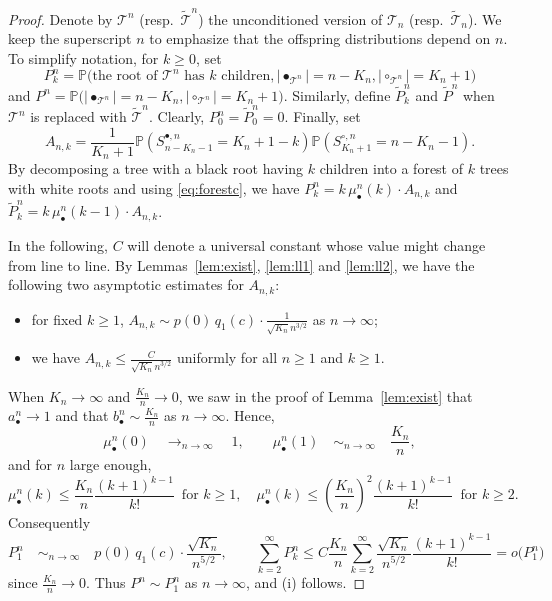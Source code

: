 \documentclass[10pt]{amsart}
\theoremstyle{definition}\newtheorem{defi}[theo]{Definition}\newtheorem{rema}[theo]{Remark}\newtheorem{exam}[theo]{Example}\newtheorem{exem}[theo]{Example}\newtheorem{nota}[theo]{Notation}
\providecommand{\abs}[1]{\lvert#1\rvert}
\def\abn{a_{\bullet}^{n}}
\def\bbn{b_{\bullet}^{n}}
\def\mubn{\mu_{\bullet}^{n}}
\def\Sbn{S^{\bullet,n}}
\def\Scn{S^{\circ,n}}
\def\tTs{\tilde{\Ts}}
\def\Ts{\mathscr{T}}
\renewcommand\Pr[1]{\mathbb{P}\left(#1\right)}
\newcommand\Prb[1]{\mathbb{P}\big(#1\big)}
\begin{document}
\begin{proof}
Denote by $\Ts^{n}$ (resp.~$\tTs^{n}$) the unconditioned version of $\Ts_{n}$ (resp.~$\tTs_{n}$). We keep the superscript $n$ to emphasize that the offspring distributions depend on $n$. To simplify notation, for $k \geq 0$, set
$$P^{n}_{k}= \Prb{\textrm{the root of }\Ts^{n} \textrm{ has } k \textrm{ children}, \abs{\bullet_{\Ts^{n}}}=n-K_{n}, \abs{\circ_{\Ts^{n}}}=K_{n}+1}$$
and  $P^{n}= \Prb{ \abs{\bullet_{\Ts^{n}}}=n-K_{n}, \abs{\circ_{\Ts^{n}}}=K_{n}+1}$.
Similarly, define $\tilde{P}^{n}_{k}$ and $\tilde{P}^{n}$ when  $\Ts^{n}$ is replaced with $\tTs^{n}$. Clearly, $P^{n}_{0}= \tilde{P}^{n}_{0}=0$.
Finally, set
\[A_{n,k}= \frac{1}{K_{n}+1} \Pr{\Sbn_{n-K_{n}-1}=K_{n}+1-k} \Pr{\Scn_{K_{n}+1}=n-K_{n}-1}.\]
By decomposing a tree with a black root having $k$ children into a forest of $k$ trees with white roots and using \eqref{eq:forestc}, we have
$P^{n}_{k}=  k\, \mubn(k) \cdot  A_{n,k}$ and $\tilde{P}^{n}_{k}= k\, \mubn(k-1) \cdot A_{n,k}$.

In the following, $C$ will denote a universal constant whose value might change from line to line.
By Lemmas~\ref{lem:exist}, \ref{lem:ll1} and \ref{lem:ll2}, we have the following two asymptotic estimates for $A_{n,k}$:
\begin{itemize}
  \item for fixed $k \geq 1$, $ A_{n,k} \sim { p(0) \, q_{1}(c)}\cdot \tfrac{1}{\sqrt{K_{n}} n^{3/2}}$ as $n \rightarrow \infty$;
  \item we have $A_{n,k} \leq  \frac{C}{\sqrt{K_{n}} n^{3/2}}$ uniformly for all $n \geq 1$ and $k \geq 1$.
\end{itemize}
When $K_{n} \rightarrow \infty$ and $\tfrac{K_{n}}{n} \rightarrow 0$, we saw in the proof of Lemma~\ref{lem:exist} that $\abn  \rightarrow 1$ and that $\bbn \sim \frac{K_{n}}{n}$ as $n \rightarrow \infty$. Hence,
\[\mubn(0)  \quad \mathop{\longrightarrow}_{n \rightarrow \infty} \quad 1, \qquad  \mubn(1)  \quad \mathop{\sim}_{n \rightarrow \infty} \quad  \frac{K_{n}}{n},\]
and for $n$ large enough,
\[\mubn(k) \leq  \frac{K_{n}}{{n}} \frac{(k+1)^{k-1}}{k!} \, \textrm{ for } k \geq 1, \quad \mubn(k) \leq  \left(  \frac{K_{n}}{{n}}  \right)^{2} \frac{(k+1)^{k-1}}{k!} \, \textrm{ for } k \geq 2.\]
Consequently
\[ P^{n}_{1}  \quad \mathop{\sim}_{n \rightarrow \infty} \quad   p(0) \,q_{1}(c) \cdot \frac{\sqrt{K_{n}}}{n^{5/2}}, \qquad \sum_{k=2}^{\infty} P^{n}_{k} \leq  C \frac{K_{n}}{n} \sum_{k=2}^{\infty}  \frac{\sqrt{K_{n}}}{n^{5/2}}  \frac{(k+1)^{k-1}}{k!}= o\big( P^{n}_{1}\big)\]
since $\tfrac{K_{n}}{n} \rightarrow 0$.
Thus $P^{n} \sim P^{n}_{1}$ as $n \rightarrow \infty$, and (i) follows.


\end{proof}
\end{document}

